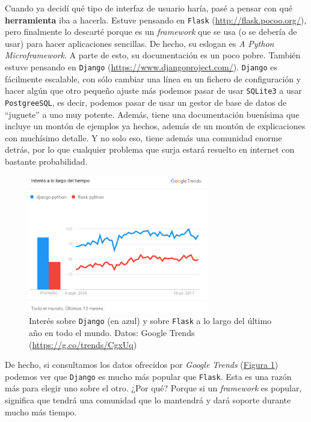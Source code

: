 Cuando ya decidí qué tipo de interfaz de usuario haría, pasé a pensar con qué \textbf{herramienta} iba a hacerla. Estuve pensando en \texttt{Flask} (\url{http://flask.pocoo.org/}), pero finalmente lo descarté porque es un \textit{framework} que se usa (o se debería de usar) para hacer aplicaciones sencillas. De hecho, su eslogan es \textit{A Python Microframework}. A parte de esto, su documentación es un poco pobre. También estuve pensando en \texttt{Django} (\url{https://www.djangoproject.com/}). \texttt{Django} es fácilmente escalable, con sólo cambiar una línea en un fichero de configuración y hacer algún que otro pequeño ajuste más podemos pasar de usar \texttt{SQLite3} a usar \texttt{PostgreeSQL}, es decir, podemos pasar de usar un gestor de base de datos de ``juguete'' a uno muy potente. Además, tiene una documentación buenísima que incluye un montón de ejemplos ya hechos, además de un montón de explicaciones con muchísimo detalle. Y no solo eso, tiene además una comunidad enorme detrás, por lo que cualquier problema que surja estará resuelto en internet con bastante probabilidad.

\begin{figure}
\centering
\includegraphics[width=0.7\textwidth]{img/django_flask_trends}
\caption{Interés sobre \texttt{Django} (en azul) y sobre \texttt{Flask} a lo largo del último año en todo el mundo. Datos: Google Trends (\url{https://g.co/trends/CgxUq})}
\label{djangoflasktrends}
\end{figure}

De hecho, si consultamos los datos ofrecidos por \textit{Google Trends} (\hyperref[djangoflasktrends]{Figura \ref*{djangoflasktrends}}) podemos ver que \texttt{Django} es mucho más popular que \texttt{Flask}. Esta es una razón más para elegir uno sobre el otro. ¿Por qué? Porque si un \textit{framework} es popular, significa que tendrá una comunidad que lo mantendrá y dará soporte durante mucho más tiempo. 

